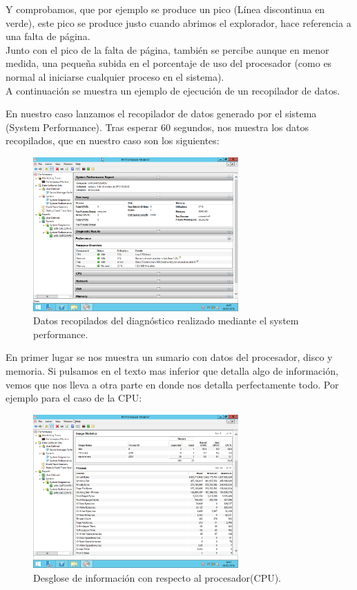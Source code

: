 Y comprobamos, que por ejemplo se produce un pico (Línea discontinua en verde), este pico se produce justo cuando abrimos el explorador, hace referencia a una falta de página. \\
\newline
Junto con el pico de la falta de página, también se percibe aunque en menor medida, una pequeña subida en el porcentaje de uso del procesador (como es normal al iniciarse cualquier proceso en el sistema). \\ 
\newline
A continuación se muestra un ejemplo de ejecución de un recopilador de datos. 

En nuestro caso lanzamos el recopilador de datos generado por el sistema (System Performance). Tras esperar 60 segundos, nos muestra los datos recopilados, que en nuestro caso son los siguientes:

\begin{figure}[H]
	\begin{center}
		\includegraphics[width=0.7\textwidth]{Imagenes/Datos_recopilados_del_diagnostico}
		\caption{Datos recopilados del diagnóstico realizado mediante el system performance.} \label{fig:8}
	\end{center}
\end{figure}

En primer lugar se nos muestra un sumario con datos del procesador, disco y memoria. Si pulsamos en el texto mas inferior que detalla algo de información, vemos que nos lleva a otra parte en donde nos detalla perfectamente todo. Por ejemplo para el caso de la CPU:
\begin{figure}[H]
	\begin{center}
		\includegraphics[width=0.7\textwidth]{Imagenes/Desglose_CPU}
		\caption{Desglose de información con respecto al procesador(CPU).} \label{fig:9}
	\end{center}
\end{figure}

